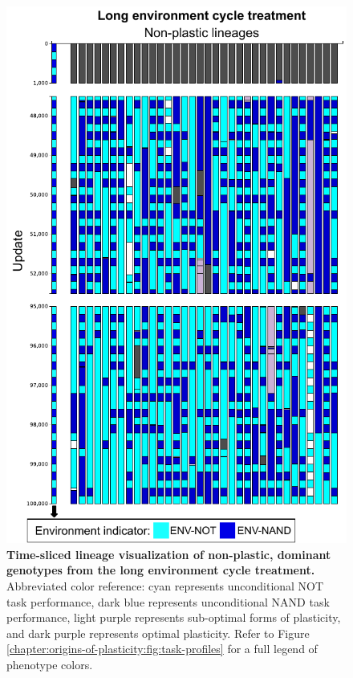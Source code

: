 \begin{figure}[ht!]
  \centering
  \includegraphics[height=0.65\textheight, keepaspectratio]
  {chapters/02-evolutionary-origins-of-plasticity/media/long-cycle-non-plastic-lineages.pdf}
  \caption{\small 
  \textbf{Time-sliced lineage visualization of non-plastic, dominant genotypes from the long environment cycle treatment.}
  Abbreviated color reference: 
  cyan represents unconditional NOT task performance, 
  dark blue represents unconditional NAND task performance, 
  light purple represents sub-optimal forms of plasticity,
  and dark purple represents optimal plasticity. 
  Refer to Figure \ref{chapter:origins-of-plasticity:fig:task-profiles} for a full legend of phenotype colors.
  }
  \label{chapter:origins-of-plasticity:fig:long-cycle-lineages}
\end{figure}
